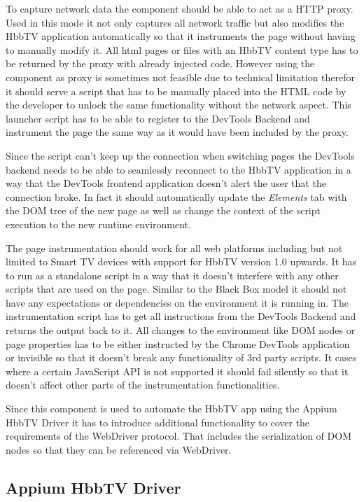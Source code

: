 To capture network data the component should be able to act as a HTTP proxy. Used in this
mode it not only captures all network traffic but also modifies the HbbTV application
automatically so that it instruments the page without having to manually modify it. All
html pages or files with an HbbTV content type has to be returned by the proxy with already
injected code. However using the component as proxy is sometimes not feasible due to technical
limitation therefor it should serve a script that has to be manually placed into the HTML code
by the developer to unlock the same functionality without the network aspect. This launcher
script has to be able to register to the DevTools Backend and instrument the page the same way
as it would have been included by the proxy.

Since the script can't keep up the connection when switching pages the DevTools backend needs to
be able to seamlessly reconnect to the HbbTV application in a way that the DevTools frontend
application doesn't alert the user that the connection broke. In fact it should automatically
update the \textit{Elements} tab with the DOM tree of the new page as well as change the context
of the script execution to the new runtime environment.

The page instrumentation should work for all web platforms including but not limited to Smart TV
devices with support for HbbTV version 1.0 upwards. It has to run as a standalone script in
a way that it doesn't interfere with any other scripts that are used on the page. Similar to the
Black Box model it should not have any expectations or dependencies on the environment it is
running in. The instrumentation script has to get all instructions from the DevTools Backend and
returns the output back to it. All changes to the environment like DOM nodes or page properties
has to be either instructed by the Chrome DevTools application or invisible so that it doesn't
break any functionality of 3rd party scripts. It cases where a certain JavaScript API is not
supported it should fail silently so that it doesn't affect other parts of the instrumentation
functionalities.

Since this component is used to automate the HbbTV app using the Appium HbbTV Driver it has to
introduce additional functionality to cover the requirements of the WebDriver protocol. That
includes the serialization of DOM nodes so that they can be referenced via WebDriver.

\subsection{Appium HbbTV Driver}

